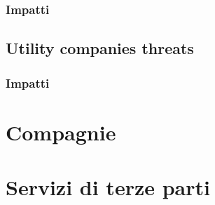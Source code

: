 \subsubsection{Impatti}

\subsection{Utility companies threats}
\subsubsection{Impatti}
\section{Compagnie}

\section{Servizi di terze parti}

